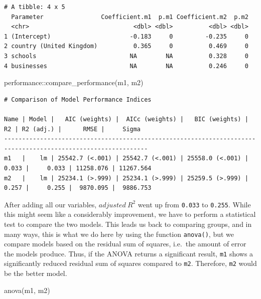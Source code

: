 \documentclass[
  letterpaper,
]{krantz}
\makeatletter
\newenvironment{Shaded}{\begin{snugshade}}{\end{snugshade}}
\newcommand{\FunctionTok}[1]{\textcolor[rgb]{0.28,0.35,0.67}{#1}}
\newcommand{\NormalTok}[1]{\textcolor[rgb]{0.00,0.23,0.31}{#1}}
\newcommand{\SpecialCharTok}[1]{\textcolor[rgb]{0.37,0.37,0.37}{#1}}
\newenvironment{kframe}{%
\medskip{}
\setlength{\fboxsep}{.8em}
 \def\at@end@of@kframe{}%
 \ifinner\ifhmode%
  \def\at@end@of@kframe{\end{minipage}}%
  \begin{minipage}{\columnwidth}%
 \fi\fi%
 \def\FrameCommand##1{\hskip\@totalleftmargin \hskip-\fboxsep
 \colorbox{shadecolor}{##1}\hskip-\fboxsep
     \hskip-\linewidth \hskip-\@totalleftmargin \hskip\columnwidth}%
 \MakeFramed {\advance\hsize-\width
   \@totalleftmargin\z@ \linewidth\hsize
   \@setminipage}}%
 {\par\unskip\endMakeFramed%
 \at@end@of@kframe}
\renewenvironment{Shaded}{\begin{kframe}}{\end{kframe}}
\makeatother
\begin{document}
\begin{verbatim}
# A tibble: 4 x 5
  Parameter                Coefficient.m1  p.m1 Coefficient.m2  p.m2
  <chr>                             <dbl> <dbl>          <dbl> <dbl>
1 (Intercept)                      -0.183     0         -0.235     0
2 country (United Kingdom)          0.365     0          0.469     0
3 schools                          NA        NA          0.328     0
4 businesses                       NA        NA          0.246     0
\end{verbatim}

\begin{Shaded}
\begin{Highlighting}[]
\NormalTok{performance}\SpecialCharTok{::}\FunctionTok{compare\_performance}\NormalTok{(m1, m2)}
\end{Highlighting}
\end{Shaded}

\begin{verbatim}
# Comparison of Model Performance Indices

Name | Model |   AIC (weights) |  AICc (weights) |   BIC (weights) |    R2 | R2 (adj.) |      RMSE |     Sigma
--------------------------------------------------------------------------------------------------------------
m1   |    lm | 25542.7 (<.001) | 25542.7 (<.001) | 25558.0 (<.001) | 0.033 |     0.033 | 11258.076 | 11267.564
m2   |    lm | 25234.1 (>.999) | 25234.1 (>.999) | 25259.5 (>.999) | 0.257 |     0.255 |  9870.095 |  9886.753
\end{verbatim}

After adding all our variables, \(adjusted\ R^2\) went up from
\texttt{0.033} to \texttt{0.255}. While this might seem like a
considerably improvement, we have to perform a statistical test to
compare the two models. This leads us back to comparing groups, and in
many ways, this is what we do here by using the function
\texttt{anova()}, but we compare models based on the residual sum of
squares, i.e.~the amount of error the models produce. Thus, if the ANOVA
returns a significant result, \texttt{m1} shows a significantly reduced
residual sum of squares compared to \texttt{m2}. Therefore, \texttt{m2}
would be the better model.

\begin{Shaded}
\begin{Highlighting}[]
\FunctionTok{anova}\NormalTok{(m1, m2)}
\end{Highlighting}
\end{Shaded}
\end{document}
